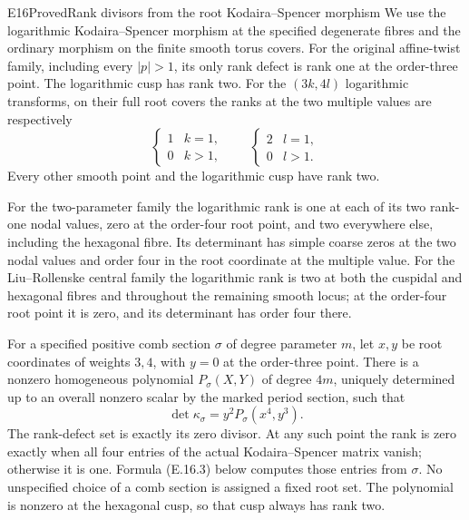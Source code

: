 \begin{statement}{E16}{Proved}{Rank divisors from the root Kodaira--Spencer morphism}
We use the logarithmic Kodaira--Spencer morphism at the specified degenerate fibres and the ordinary morphism on the finite smooth torus covers. For the original affine-twist family, including every $|p|>1$, its only rank defect is rank one at the order-three point. The logarithmic cusp has rank two. For the $(3k,4l)$ logarithmic transforms, on their full root covers the ranks at the two multiple values are respectively
\[
 \begin{cases}1&k=1,\\0&k>1,\end{cases}
 \qquad
 \begin{cases}2&l=1,\\0&l>1.\end{cases}                 \tag{E.16.1}
\]
Every other smooth point and the logarithmic cusp have rank two.

For the two-parameter family the logarithmic rank is one at each of its two rank-one nodal values, zero at the order-four root point, and two everywhere else, including the hexagonal fibre. Its determinant has simple coarse zeros at the two nodal values and order four in the root coordinate at the multiple value. For the Liu--Rollenske central family the logarithmic rank is two at both the cuspidal and hexagonal fibres and throughout the remaining smooth locus; at the order-four root point it is zero, and its determinant has order four there.

For a specified positive comb section $\sigma$ of degree parameter $m$, let $x,y$ be root coordinates of weights $3,4$, with $y=0$ at the order-three point. There is a nonzero homogeneous polynomial $P_\sigma(X,Y)$ of degree $4m$, uniquely determined up to an overall nonzero scalar by the marked period section, such that
\[
 \det\kappa_\sigma=y^2P_\sigma(x^4,y^3).             \tag{E.16.2}
\]
The rank-defect set is exactly its zero divisor. At any such point the rank is zero exactly when all four entries of the actual Kodaira--Spencer matrix vanish; otherwise it is one. Formula (E.16.3) below computes those entries from $\sigma$. No unspecified choice of a comb section is assigned a fixed root set. The polynomial is nonzero at the hexagonal cusp, so that cusp always has rank two.
\end{statement}
